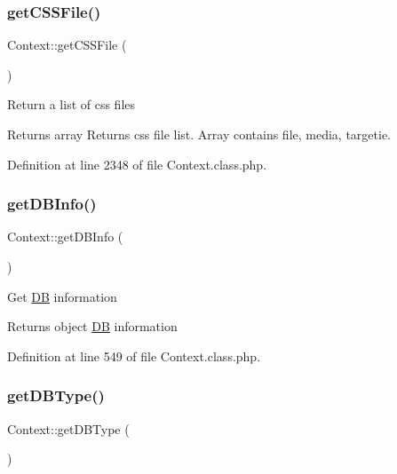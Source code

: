 \subsubsection{\texorpdfstring{get\+C\+S\+S\+File()}{getCSSFile()}}
{\footnotesize\ttfamily Context\+::get\+C\+S\+S\+File (\begin{DoxyParamCaption}{ }\end{DoxyParamCaption})}

Return a list of css files

\begin{DoxyReturn}{Returns}
array Returns css file list. Array contains file, media, targetie. 
\end{DoxyReturn}


Definition at line 2348 of file Context.\+class.\+php.

\mbox{\label{classContext_a54dd61c7b035a12697db8ca3f1c6849c}} 
\subsubsection{\texorpdfstring{get\+D\+B\+Info()}{getDBInfo()}}
{\footnotesize\ttfamily Context\+::get\+D\+B\+Info (\begin{DoxyParamCaption}{ }\end{DoxyParamCaption})}

Get \hyperlink{classDB}{DB} information

\begin{DoxyReturn}{Returns}
object \hyperlink{classDB}{DB} information 
\end{DoxyReturn}


Definition at line 549 of file Context.\+class.\+php.

\mbox{\label{classContext_a2e90e7083bcc220daeec3d4d8d3bb427}} 
\subsubsection{\texorpdfstring{get\+D\+B\+Type()}{getDBType()}}
{\footnotesize\ttfamily Context\+::get\+D\+B\+Type (\begin{DoxyParamCaption}{ }\end{DoxyParamCaption})}

